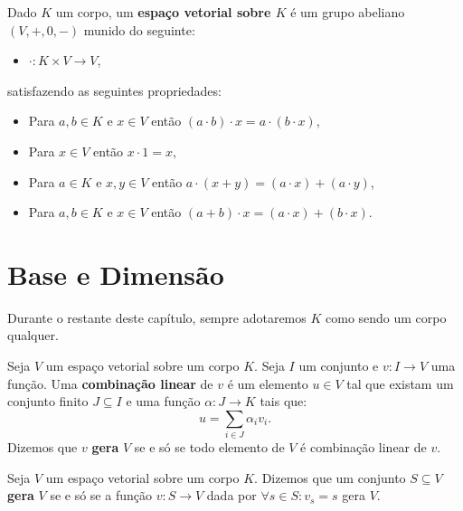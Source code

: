\documentclass[11pt,twoside,a4paper]{book}
\begin{document}
\begin{definicao}
Dado $K$ um corpo, um \textbf{espaço vetorial sobre $K$} é um grupo abeliano $(V,+,0,-)$ munido do seguinte:
\begin{itemize}
\item $\cdot:K\times V\rightarrow V$,
\end{itemize}
satisfazendo as seguintes propriedades:
\begin{itemize}
\item Para $a,b\in K$ e $x\in V$ então $(a\cdot b)\cdot x=a\cdot(b\cdot x)$,
\item Para $x\in V$ então $x\cdot 1=x$,
\item Para $a\in K$ e $x,y\in V$ então $a\cdot(x+y)=(a\cdot x)+(a\cdot y)$,
\item Para $a,b\in K$ e $x\in V$ então $(a+b)\cdot x=(a\cdot x)+(b\cdot x)$.
\end{itemize}
\end{definicao}

\section{Base e Dimensão}

Durante o restante deste capítulo, sempre adotaremos $K$ como sendo um corpo qualquer.

\begin{definicao}
Seja $V$ um espaço vetorial sobre um corpo $K$. Seja $I$ um conjunto e $v:I\rightarrow V$ uma função. Uma \textbf{combinação linear} de $v$ é um elemento $u\in V$ tal que existam um conjunto finito $J\subseteq I$ e uma função $\alpha:J\rightarrow K$ tais que:
\[
u=\sum_{i\in J}\alpha_iv_i.
\]
Dizemos que $v$ \textbf{gera} $V$ se e só se todo elemento de $V$ é combinação linear de $v$.
\end{definicao}

\begin{definicao}
Seja $V$ um espaço vetorial sobre um corpo $K$. Dizemos que um conjunto $S\subseteq V$ \textbf{gera} $V$ se e só se a função $v:S\rightarrow V$ dada por $\forall s\in S:v_s=s$ gera $V$.
\end{definicao}
\end{document}
